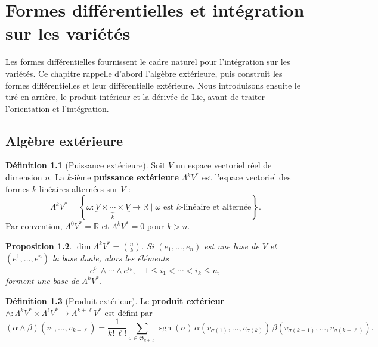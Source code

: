 \documentclass[12pt,a4paper,openany]{book}
\theoremstyle{definition}
\newtheorem{definition}{Définition}[chapter]
\theoremstyle{plain}
\newtheorem{proposition}[definition]{Proposition}
\theoremstyle{remark}
\newcommand{\R}{\mathbb{R}}
\newcommand{\set}[1]{\left\{#1\right\}}
\begin{document}
\chapter{Formes différentielles et intégration sur les variétés}%
\label{ch:formes-differentielles}
\minitoc\vspace{1cm}

Les formes différentielles fournissent le cadre naturel pour
l'intégration sur les variétés. Ce chapitre rappelle d'abord l'algèbre
extérieure, puis construit les formes différentielles et leur
différentielle extérieure. Nous introduisons ensuite le tiré en arrière,
le produit intérieur et la dérivée de Lie, avant de traiter l'orientation
et l'intégration.

\section{Algèbre extérieure}\label{sec:algebre-exterieure}

\begin{definition}[Puissance extérieure]\label{def:puissance-exterieure}%
Soit $V$ un espace vectoriel réel de dimension $n$. La $k$-ième
\textbf{puissance extérieure} $\Lambda^k V^*$ est l'espace vectoriel
des formes $k$-linéaires alternées sur $V$ :
\[
  \Lambda^k V^* = \set{\omega \colon \underbrace{V \times \cdots
    \times V}_{k} \to \R \;\Big|\;
    \omega \text{ est $k$-linéaire et alternée}}.
\]
Par convention, $\Lambda^0 V^* = \R$ et $\Lambda^k V^* = 0$ pour $k > n$.
\end{definition}

\begin{proposition}\label{prop:dim-exterieure}
$\dim \Lambda^k V^* = \binom{n}{k}$. Si $(e_1, \ldots, e_n)$ est une
base de $V$ et $(e^1, \ldots, e^n)$ la base duale, alors les éléments
\[
  e^{i_1} \wedge \cdots \wedge e^{i_k}, \quad
  1 \leq i_1 < \cdots < i_k \leq n,
\]
forment une base de $\Lambda^k V^*$.
\end{proposition}

\begin{definition}[Produit extérieur]\label{def:produit-exterieur}%
\index{$\wedge$}
Le \textbf{produit extérieur}
$\wedge \colon \Lambda^k V^* \times \Lambda^\ell V^* \to
  \Lambda^{k+\ell} V^*$
est défini par
\[
  (\alpha \wedge \beta)(v_1, \ldots, v_{k+\ell}) =
    \frac{1}{k!\,\ell!} \sum_{\sigma \in \mathfrak{S}_{k+\ell}}
    \operatorname{sgn}(\sigma)\, \alpha(v_{\sigma(1)}, \ldots,
    v_{\sigma(k)})\, \beta(v_{\sigma(k+1)}, \ldots, v_{\sigma(k+\ell)}).
\]
\end{definition}
\end{document}
